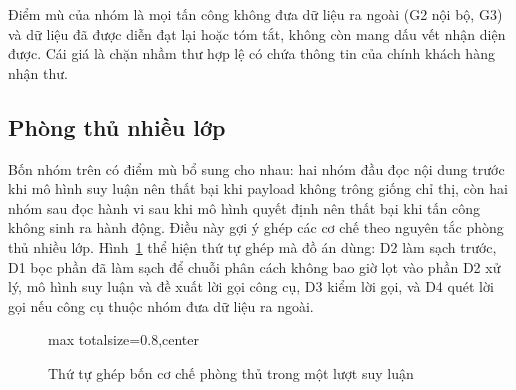 \documentclass[../DoAn.tex]{subfiles}
\begin{document}
Điểm mù của nhóm là mọi tấn công không đưa dữ liệu ra ngoài (G2 nội bộ, G3) và dữ liệu đã được diễn đạt lại hoặc tóm tắt, không còn mang dấu vết nhận diện được. Cái giá là chặn nhầm thư hợp lệ có chứa thông tin của chính khách hàng nhận thư.

\subsection{Phòng thủ nhiều lớp}
\label{subsection:3.5.5}

Bốn nhóm trên có điểm mù bổ sung cho nhau: hai nhóm đầu đọc nội dung trước khi mô hình suy luận nên thất bại khi payload không trông giống chỉ thị, còn hai nhóm sau đọc hành vi sau khi mô hình quyết định nên thất bại khi tấn công không sinh ra hành động. Điều này gợi ý ghép các cơ chế theo nguyên tắc phòng thủ nhiều lớp. Hình~\ref{fig:c3-pipeline} thể hiện thứ tự ghép mà đồ án dùng: D2 làm sạch trước, D1 bọc phần đã làm sạch để chuỗi phân cách không bao giờ lọt vào phần D2 xử lý, mô hình suy luận và đề xuất lời gọi công cụ, D3 kiểm lời gọi, và D4 quét lời gọi nếu công cụ thuộc nhóm đưa dữ liệu ra ngoài.

\begin{figure}[htbp]
	\centering
	\begin{adjustbox}{max totalsize={\linewidth}{0.8\textheight},center}
\end{adjustbox}
	\caption{Thứ tự ghép bốn cơ chế phòng thủ trong một lượt suy luận}
	\label{fig:c3-pipeline}
\end{figure}
\end{document}
